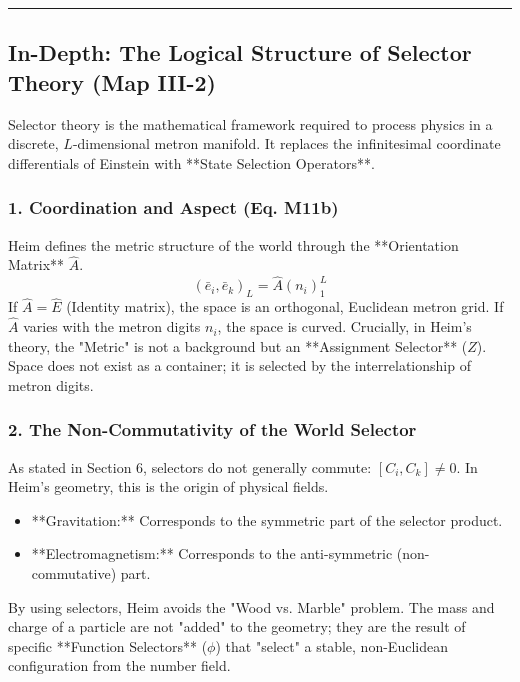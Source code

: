 \documentclass[11pt,a4paper,oneside]{article}
\newcommand{\hr}{\par\vspace{2em}\noindent\rule{\linewidth}{0.4pt}\par\vspace{2em}}
\begin{document}
\hr

\subsection*{In-Depth: The Logical Structure of Selector Theory (Map III-2)}

Selector theory is the mathematical framework required to process physics in a discrete, $L$-dimensional metron manifold. It replaces the infinitesimal coordinate differentials of Einstein with **State Selection Operators**.

\subsubsection*{1. Coordination and Aspect (Eq. M11b)}
Heim defines the metric structure of the world through the **Orientation Matrix** $\hat{A}$.
\begin{equation}
    (\bar{e}_i, \bar{e}_k)_L = \hat{A}(n_i)_1^L
\end{equation}
If $\hat{A} = \hat{E}$ (Identity matrix), the space is an orthogonal, Euclidean metron grid. If $\hat{A}$ varies with the metron digits $n_i$, the space is curved. Crucially, in Heim's theory, the "Metric" is not a background but an **Assignment Selector** ($Z$). Space does not exist as a container; it is selected by the interrelationship of metron digits.

\subsubsection*{2. The Non-Commutativity of the World Selector}
As stated in Section 6, selectors do not generally commute: $[C_i, C_k] \neq 0$. In Heim's geometry, this is the origin of physical fields. 
\begin{itemize}
    \item **Gravitation:** Corresponds to the symmetric part of the selector product.
    \item **Electromagnetism:** Corresponds to the anti-symmetric (non-commutative) part.
\end{itemize}
By using selectors, Heim avoids the "Wood vs. Marble" problem. The mass and charge of a particle are not "added" to the geometry; they are the result of specific **Function Selectors** ($\phi$) that "select" a stable, non-Euclidean configuration from the number field.
\end{document}
